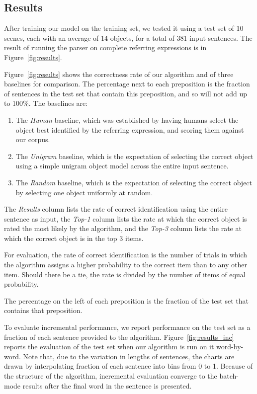 \documentclass[conference]{IEEEtran}
\numberwithin{equation}{section}
\begin{document}
\subsection{Results}

After training our model on the training set, we tested it using a test set of 10 scenes, each with an average of 14 objects, for a total of 381 input sentences. The result of running the parser on complete referring expressions is in Figure~\ref{fig:results}.

Figure~\ref{fig:results} shows the correctness rate of our algorithm and of three baselines for comparison. The percentage next to each preposition is the fraction of sentences in the test set that contain this preposition, and so will not add up to 100\%. The baselines are:
\begin{enumerate}[topsep=0pt,itemsep=-1ex,partopsep=1ex,parsep=1ex]
	\item The \emph{Human} baseline, which was established by having humans select the object best identified by the referring expression, and scoring them against our corpus.
	\item The \emph{Unigram} baseline, which is the expectation of selecting the correct object using a simple unigram object model across the entire input sentence.
	\item The \emph{Random} baseline, which is the expectation of selecting the correct object by selecting one object uniformly at random.
\end{enumerate}

The \emph{Results} column lists the rate of correct identification using the entire sentence as input, the \emph{Top-1} column lists the rate at which the correct object is rated the most likely by the algorithm, and the \emph{Top-3} column lists the rate at which the correct object is in the top 3 items.

For evaluation, the rate of correct identification is the number of trials in which the algorithm assigns a higher probability to the correct item than to any other item. Should there be a tie, the rate is divided by the number of items of equal probability.

The percentage on the left of each preposition is the fraction of the test set that contains that preposition.

To evaluate incremental performance, we report performance on the test set as a fraction of each sentence provided to the algorithm. Figure~\ref{fig:results_inc} reports the evaluation of the test set when our algorithm is run on it word-by-word. Note that, due to the variation in lengths of sentences, the charts are drawn by interpolating fraction of each sentence into bins from 0 to 1. Because of the structure of the algorithm, incremental evaluation converge to the batch-mode results after the final word in the sentence is presented.
\end{document}
